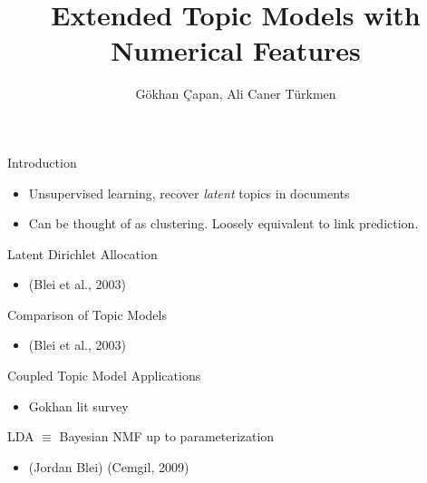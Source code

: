 \documentclass[pdf]{beamer}
\title{Extended Topic Models with Numerical Features}
\author{G\" okhan \c Capan, Ali Caner T\" urkmen}
\begin{document}
	
\begin{frame}
	\titlepage
\end{frame}

\begin{frame}{Introduction}
	
	\begin{itemize}
		\item Unsupervised learning, recover \emph{latent} topics in documents
		\item Can be thought of as clustering. Loosely equivalent to link prediction.
	\end{itemize}
	
\end{frame}

\begin{frame}{Latent Dirichlet Allocation}
	
	\begin{itemize}
		\item (Blei et al., 2003)
	\end{itemize}
	
\end{frame}

\begin{frame}{Comparison of Topic Models}
	
	\begin{itemize}
		\item (Blei et al., 2003)
	\end{itemize}
	
\end{frame}

\begin{frame}{Coupled Topic Model Applications}
	
	\begin{itemize}
		\item Gokhan lit survey
	\end{itemize}
	
\end{frame}

\begin{frame}{LDA $\equiv$ Bayesian NMF up to parameterization }
	
	\begin{itemize}
		\item (Jordan Blei) (Cemgil, 2009)
	\end{itemize}
	
\end{frame}
\end{document}
